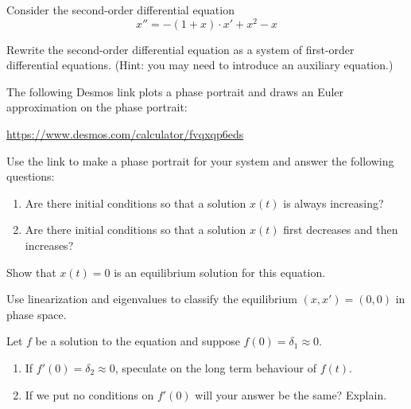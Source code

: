 \documentclass{workbook}
\begin{document}
\begin{slide}
	\question
	Consider the second-order differential equation
	\[
		x''=-(1+x)\cdot x'+x^2-x
	\]

	\begin{parts}
		\item Rewrite the second-order differential equation as a system of first-order differential equations. (Hint:
		you may need to introduce an auxiliary equation.)

		\item The following Desmos link plots a phase portrait and draws an Euler approximation on the phase portrait:

		{\small \url{https://www.desmos.com/calculator/fvqxqp6eds}}

		Use the link to make a phase portrait for your system and answer the following questions:
		\begin{enumerate}
			\item Are there initial conditions so that a solution $x(t)$ is always increasing?
			\item Are there initial conditions so that a solution $x(t)$ first decreases and then increases?
		\end{enumerate}

		\item Show that $x(t)=0$ is an equilibrium solution for this equation.

		\item Use linearization and eigenvalues to classify the equilibrium $(x,x')=(0,0)$
		in phase space.

		\item Let $f$ be a solution to the equation and suppose $f(0)=\delta_1\approx 0$.
		\begin{enumerate}
			\item If $f'(0)=\delta_2\approx 0$, speculate on the long term behaviour of $f(t)$.
			\item If we put no conditions on $f'(0)$ will your answer be the same? Explain.
		\end{enumerate}

	\end{parts}
\end{slide}
\end{document}

